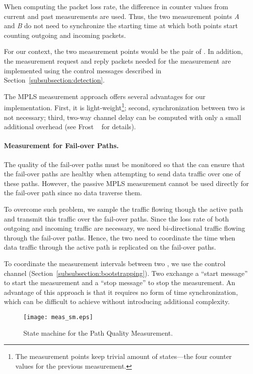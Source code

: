 When computing the packet loss rate, the difference in counter values from
current and past measurements are used. Thus, the two measurement points
\textit{A} and \textit{B} do not need to synchronize the starting time at which
both points start counting outgoing and incoming packets.

For our context, the two measurement points would be the pair of \names. In
addition, the measurement request and reply packets needed for the measurement
are implemented using the \name control messages described in
Section~\ref{subsubsection:detection}.

The MPLS measurement approach offers several advantages for our implementation.
First, it is light-weight\footnote{The measurement points keep trivial amount
of states---the four counter values for the previous measurement.}; second,
synchronization between two \names is not necessary; third, two-way channel
delay can be computed with only a small additional overhead (see Frost
\etal~\cite{rfc6374} for details).

\paragraph{Measurement for Fail-over Paths.} The quality of the fail-over paths
must be monitored so that the \name can ensure that the fail-over paths are
healthy when attempting to send data traffic over one of these paths.  However,
the passive MPLS measurement cannot be used directly for the fail-over path
since no data traverse them.

To overcome such problem, we sample the traffic flowing though the active path
and transmit this traffic over the fail-over paths. Since the loss rate of both
outgoing and incoming traffic are necessary, we need bi-directional traffic
flowing through the fail-over paths. Hence, the two \names need to coordinate
the time when data traffic through the active path is replicated on the
fail-over paths.

To coordinate the measurement intervals between two \names, we use the \name
control channel (Section~\ref{subsubsection:bootstrapping}). Two \names
exchange a ``start message'' to start the measurement and a ``stop message'' to
stop the measurement. An advantage of this approach is that it requires no form
of time synchronization, which can be difficult to achieve without introducing
additional complexity.

\begin{figure}[!htb]
\centering
\texttt{[image: meas\_sm.eps]}
\caption{State machine for the Path Quality Measurement.}
\label{fig:native_measurement}
\end{figure}

